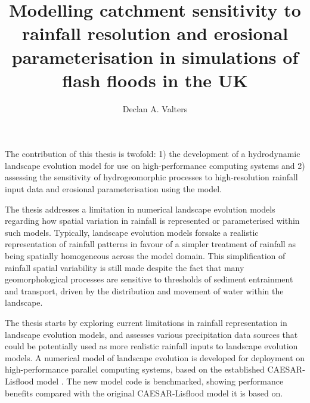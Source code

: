 
\title{Modelling catchment sensitivity to rainfall resolution and erosional parameterisation in simulations of flash floods in the UK}

\author{Declan A. Valters}
\def\wordcount{74333}




\beforeabstract
The contribution of this thesis is twofold: 1) the development of a hydrodynamic landscape evolution model for use on high-performance computing systems and 2) assessing the sensitivity of hydrogeomorphic processes to high-resolution rainfall input data and erosional parameterisation using the model.

The thesis addresses a limitation in numerical landscape evolution models regarding how spatial variation in rainfall is represented or parameterised within such models. Typically, landscape evolution models forsake a realistic representation of rainfall patterns in favour of a simpler treatment of rainfall as being spatially homogeneous across the model domain. This simplification of rainfall spatial variability is still made despite the fact that many geomorphological processes are sensitive to thresholds of sediment entrainment and transport, driven by the distribution and movement of water within the landscape. 

The thesis starts by exploring current limitations in rainfall representation in landscape evolution models, and assesses various precipitation data sources that could be potentially used as more realistic rainfall inputs to landscape evolution models. A numerical model of landscape evolution is developed for deployment on high-performance parallel computing systems, based on the established CAESAR-Lisflood model \citep{Coulthard2013}. The new model code is benchmarked, showing performance benefits compared with the original CAESAR-Lisflood model it is based on.

